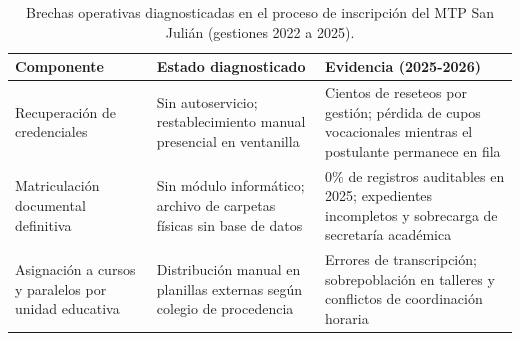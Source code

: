 \begin{table}[htbp]
    \centering
    \caption{Brechas operativas diagnosticadas en el proceso de inscripción del MTP San Julián (gestiones 2022 a 2025).}
    \label{tab:brechas_diagnostico}
    \begin{tabularx}{\textwidth}{L L L}
        \toprule
        \textbf{Componente} & \textbf{Estado diagnosticado} & \textbf{Evidencia (2025-2026)} \\
        \midrule
        Recuperación de credenciales & Sin autoservicio; restablecimiento manual presencial en ventanilla & Cientos de reseteos por gestión; pérdida de cupos vocacionales mientras el postulante permanece en fila \\
        Matriculación documental definitiva & Sin módulo informático; archivo de carpetas físicas sin base de datos & 0\% de registros auditables en 2025; expedientes incompletos y sobrecarga de secretaría académica \\
        Asignación a cursos y paralelos por unidad educativa & Distribución manual en planillas externas según colegio de procedencia & Errores de transcripción; sobrepoblación en talleres y conflictos de coordinación horaria \\
        \bottomrule
    \end{tabularx}
\end{table}
